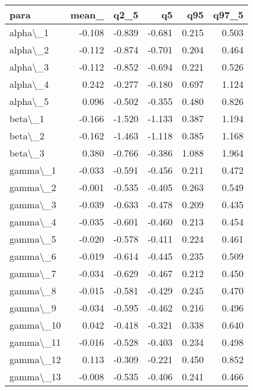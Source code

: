 \documentclass[
  11pt,
  letterpaper,
  DIV=11,
  numbers=noendperiod]{scrartcl}
\begin{document}
\begin{table}
\centering
\begin{tabular}[t]{l|r|r|r|r|r}
\hline
para & mean\_ & q2\_5 & q5 & q95 & q97\_5\\
\hline
alpha\textbackslash{}\_1 & -0.108 & -0.839 & -0.681 & 0.215 & 0.503\\
\hline
alpha\textbackslash{}\_2 & -0.112 & -0.874 & -0.701 & 0.204 & 0.464\\
\hline
alpha\textbackslash{}\_3 & -0.112 & -0.852 & -0.694 & 0.221 & 0.526\\
\hline
alpha\textbackslash{}\_4 & 0.242 & -0.277 & -0.180 & 0.697 & 1.124\\
\hline
alpha\textbackslash{}\_5 & 0.096 & -0.502 & -0.355 & 0.480 & 0.826\\
\hline
beta\textbackslash{}\_1 & -0.166 & -1.520 & -1.133 & 0.387 & 1.194\\
\hline
beta\textbackslash{}\_2 & -0.162 & -1.463 & -1.118 & 0.385 & 1.168\\
\hline
beta\textbackslash{}\_3 & 0.380 & -0.766 & -0.386 & 1.088 & 1.964\\
\hline
gamma\textbackslash{}\_1 & -0.033 & -0.591 & -0.456 & 0.211 & 0.472\\
\hline
gamma\textbackslash{}\_2 & -0.001 & -0.535 & -0.405 & 0.263 & 0.549\\
\hline
gamma\textbackslash{}\_3 & -0.039 & -0.633 & -0.478 & 0.209 & 0.435\\
\hline
gamma\textbackslash{}\_4 & -0.035 & -0.601 & -0.460 & 0.213 & 0.454\\
\hline
gamma\textbackslash{}\_5 & -0.020 & -0.578 & -0.411 & 0.224 & 0.461\\
\hline
gamma\textbackslash{}\_6 & -0.019 & -0.614 & -0.445 & 0.235 & 0.509\\
\hline
gamma\textbackslash{}\_7 & -0.034 & -0.629 & -0.467 & 0.212 & 0.450\\
\hline
gamma\textbackslash{}\_8 & -0.015 & -0.581 & -0.429 & 0.245 & 0.470\\
\hline
gamma\textbackslash{}\_9 & -0.034 & -0.595 & -0.462 & 0.216 & 0.496\\
\hline
gamma\textbackslash{}\_10 & 0.042 & -0.418 & -0.321 & 0.338 & 0.640\\
\hline
gamma\textbackslash{}\_11 & -0.016 & -0.528 & -0.403 & 0.234 & 0.498\\
\hline
gamma\textbackslash{}\_12 & 0.113 & -0.309 & -0.221 & 0.450 & 0.852\\
\hline
gamma\textbackslash{}\_13 & -0.008 & -0.535 & -0.406 & 0.241 & 0.466\\

\end{tabular}
\end{table}
\end{document}
